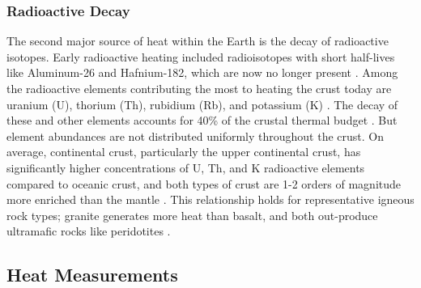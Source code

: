\subsubsection{Radioactive Decay}\label{ch2:radio}
The second major source of heat within the Earth is the decay of radioactive isotopes. Early radioactive heating included radioisotopes with short half-lives like Aluminum-26 and Hafnium-182, which are now no longer present \citep[~p. 16]{glassley_geothermal_2015}. Among the radioactive elements contributing the most to heating the crust today are uranium (U), thorium (Th), rubidium (Rb), and potassium (K) \citep[~p. 17]{glassley_geothermal_2015}. The decay of these and other elements accounts for 40\% of the crustal thermal budget \citep{stein_heat_1995}. But element abundances are not distributed uniformly throughout the crust. On average, continental crust, particularly the upper continental crust, has significantly higher concentrations of U, Th, and K radioactive elements compared to oceanic crust, and both types of crust are 1-2 orders of magnitude more enriched than the mantle \citep[~p. 276]{fowler_solid_2005}. This relationship holds for representative igneous rock types; granite generates more heat than basalt, and both out-produce ultramafic rocks like peridotites \citep[~p. 276]{fowler_solid_2005}.
\subsection{Heat Measurements}\label{ch2:heatmeas}
